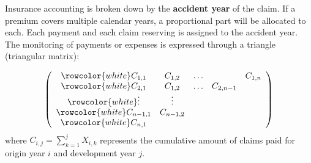 \begin{f}
	
	Insurance accounting is broken down by the \textbf{accident year} of the claim. 
	If a premium covers multiple calendar years, a proportional part will be allocated to each.
	Each payment and each claim reserving is assigned to the accident year. 
	The monitoring of payments or expenses is expressed through a triangle (triangular matrix):
	
	\[
	\left(\begin{array}{ccccc}
		\rowcolor{white}	C_{1,1} & C_{1,2} & \ldots & & C_{1, n} \\
		\rowcolor{white}	C_{2,1} & C_{1,2} & \ldots & C_{2, n-1} \\
		\rowcolor{white}	\vdots & \vdots & & \\
		\rowcolor{white}	C_{n-1,1} & C_{n-1,2} & & \\
		\rowcolor{white}	C_{n, 1} & & &
	\end{array}\right)
	\]
	where \(C_{i, j}=\sum_{k=1}^{j} X_{i, k}\) represents the cumulative amount of claims paid for origin year \(i\) and development year \(j\).
	
\end{f}


